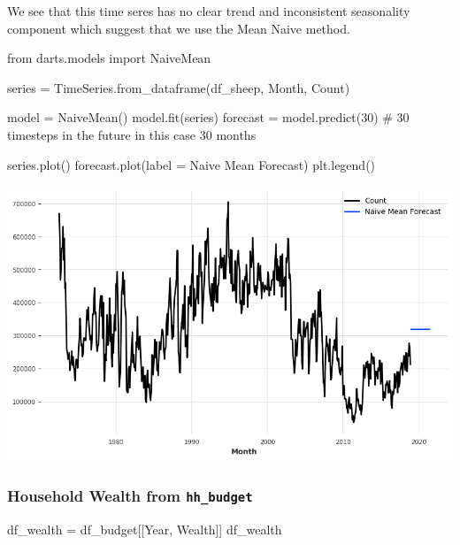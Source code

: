 \documentclass[
  11pt,
]{article}
\newenvironment{Shaded}{\begin{snugshade}}{\end{snugshade}}
\newcommand{\CommentTok}[1]{\textcolor[rgb]{0.37,0.37,0.37}{#1}}
\newcommand{\DecValTok}[1]{\textcolor[rgb]{0.68,0.00,0.00}{#1}}
\newcommand{\ImportTok}[1]{\textcolor[rgb]{0.00,0.46,0.62}{#1}}
\newcommand{\NormalTok}[1]{\textcolor[rgb]{0.00,0.23,0.31}{#1}}
\newcommand{\OperatorTok}[1]{\textcolor[rgb]{0.37,0.37,0.37}{#1}}
\newcommand{\StringTok}[1]{\textcolor[rgb]{0.13,0.47,0.30}{#1}}
\begin{document}
We see that this time seres has no clear trend and inconsistent
seasonality component which suggest that we use the Mean Naive method.

\begin{Shaded}
\begin{Highlighting}[]
\ImportTok{from}\NormalTok{ darts.models }\ImportTok{import}\NormalTok{ NaiveMean}

\NormalTok{series }\OperatorTok{=}\NormalTok{ TimeSeries.from\_dataframe(df\_sheep, }\StringTok{\textquotesingle{}Month\textquotesingle{}}\NormalTok{, }\StringTok{\textquotesingle{}Count\textquotesingle{}}\NormalTok{)}

\NormalTok{model }\OperatorTok{=}\NormalTok{ NaiveMean() }
\NormalTok{model.fit(series)}
\NormalTok{forecast }\OperatorTok{=}\NormalTok{ model.predict(}\DecValTok{30}\NormalTok{) }\CommentTok{\# 30 timesteps in the future in this case 30 months}

\NormalTok{series.plot()}
\NormalTok{forecast.plot(label }\OperatorTok{=} \StringTok{\textquotesingle{}Naive Mean Forecast\textquotesingle{}}\NormalTok{)}
\NormalTok{plt.legend()}
\end{Highlighting}
\end{Shaded}

\includegraphics{hw3_files/figure-pdf/cell-19-output-1.png}

\subsubsection{\texorpdfstring{Household Wealth from
\texttt{hh\_budget}}{Household Wealth from hh\_budget}}\label{household-wealth-from-hh_budget}

\begin{Shaded}
\begin{Highlighting}[]
\NormalTok{df\_wealth }\OperatorTok{=}\NormalTok{ df\_budget[[}\StringTok{\textquotesingle{}Year\textquotesingle{}}\NormalTok{, }\StringTok{\textquotesingle{}Wealth\textquotesingle{}}\NormalTok{]]}
\NormalTok{df\_wealth}
\end{Highlighting}
\end{Shaded}
\end{document}
